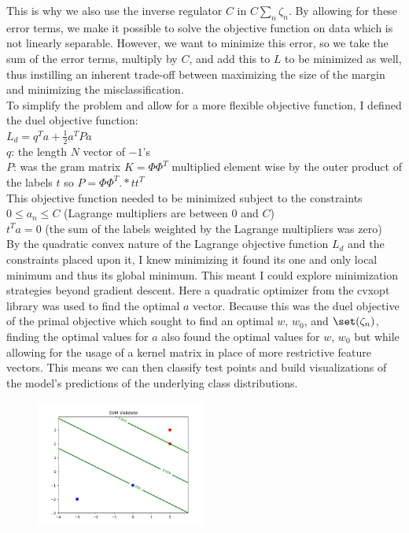 \documentclass{article}
\begin{document}
This is why we also use the inverse regulator $C$ in $C \sum_n \zeta_n$. By allowing for these error terms, we make it possible to solve the objective function on data which is not linearly separable. However, we want to minimize this error, so we take the sum of the error terms, multiply by $C$, and add this to $L$ to be minimized as well, thus instilling an inherent trade-off between maximizing the size of the margin and minimizing the misclassification.\\
To simplify the problem and allow for a more flexible objective function, I defined the duel objective function: \\
$L_d = q^Ta + \frac{1}{2}a^TPa$\\
$q$: the length $N$ vector of $-1$'s\\
$P$: was the gram matrix $K = \Phi\Phi^T$ multiplied element wise by  the outer product of the labels $t$ so $P = \Phi\Phi^T .* tt^T$\\
This objective function needed to be minimized subject to the constraints \\
$0 \leq a_n \leq C$ (Lagrange multipliers are between $0$ and $C$)\\
$t^Ta = 0$ (the sum of the labels weighted by the Lagrange multipliers was zero)\\
By the quadratic convex nature of the Lagrange objective function $L_d$ and the constraints placed upon it, I knew minimizing it found its one and only local minimum and thus its global minimum. This meant I could explore minimization strategies beyond gradient descent. Here a quadratic optimizer from the cvxopt library was used to find the optimal $a$ vector. 
Because this was the duel objective of the primal objective which sought to find an optimal $w$, $w_0$, and $\set(\zeta_n)$, finding the optimal values for $a$ also found the optimal values for $w$, $w_0$ but while allowing for the usage of a kernel matrix in place of more restrictive feature vectors. This means we can then classify test points and build visualizations of the model's predictions of the underlying class distributions. \\
 
\begin{figure} %
    \centering
    \includegraphics[width=0.5\textwidth]{mini_batch.png}
\end{figure}
\end{document}
